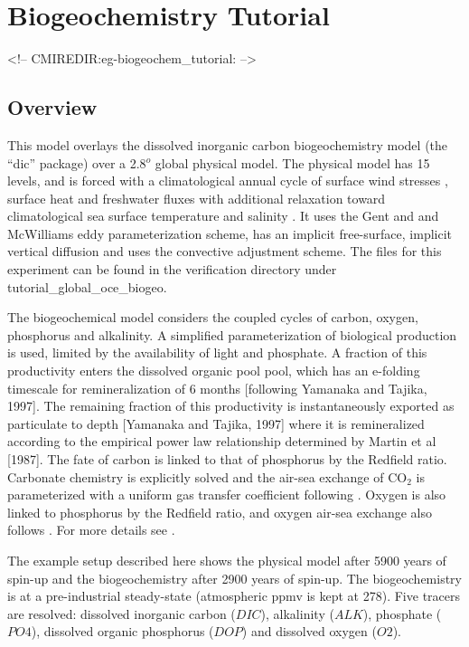 \section{Biogeochemistry Tutorial}
\label{www:tutorials}
\label{sect:eg-biogeochem_tutorial}
\begin{rawhtml}
<!-- CMIREDIR:eg-biogeochem_tutorial: -->
\end{rawhtml}

\subsection{Overview}
This model overlays the dissolved inorganic carbon biogeochemistry
model (the ``dic'' package) over a 2.8$^o$ global physical model. The
physical model has 15 levels, and is forced with a climatological
annual cycle of surface wind stresses \cite{Trenberth_etal_89},
surface heat and freshwater fluxes \cite{jiang99} with additional
relaxation toward climatological sea surface temperature and salinity
\cite{lev:94a,Levitus94}.  It uses the Gent and and McWilliams
\cite{gen-mcw:90} eddy parameterization scheme, has an implicit
free-surface, implicit vertical diffusion and uses the convective
adjustment scheme. The files for this experiment can be found in
the verification directory under tutorial\_global\_oce\_biogeo.

The biogeochemical model considers the coupled cycles of carbon,
oxygen, phosphorus and alkalinity.  A simplified parameterization of
biological production is used, limited by the availability of light
and phosphate.  A fraction of this productivity enters the dissolved
organic pool pool, which has an e-folding timescale for
remineralization of 6 months [following Yamanaka and Tajika, 1997].
The remaining fraction of this productivity is instantaneously
exported as particulate to depth [Yamanaka and Tajika, 1997] where it
is remineralized according to the empirical power law relationship
determined by Martin et al [1987].  The fate of carbon is linked to
that of phosphorus by the Redfield ratio. Carbonate chemistry is
explicitly solved \cite{Follows_etal_05} and the air-sea exchange of
CO$_2$ is parameterized with a uniform gas transfer coefficient
following \cite{Wanninkhof_92}. Oxygen is also linked to phosphorus by
the Redfield ratio, and oxygen air-sea exchange also follows
\cite{Wanninkhof_92}.  For more details see \cite{Dutkiewicz_etal_05}.

The example setup described here shows the physical model after 5900
years of spin-up and the biogeochemistry after 2900 years of spin-up.
The biogeochemistry is at a pre-industrial steady-state (atmospheric
ppmv is kept at 278). Five tracers are resolved: dissolved inorganic
carbon ($DIC$), alkalinity ($ALK$), phosphate ($PO4$), dissolved
organic phosphorus ($DOP$) and dissolved oxygen ($O2$).

